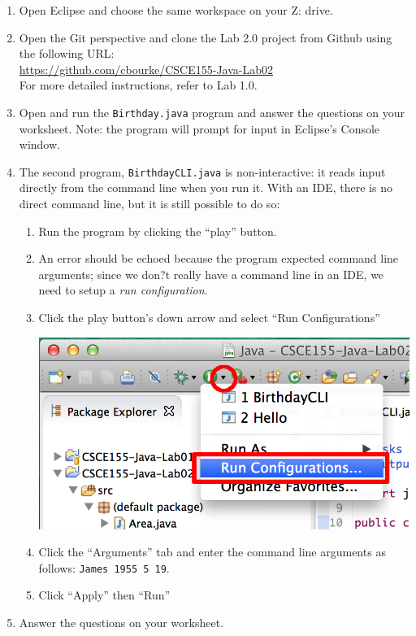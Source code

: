 \documentclass[12pt]{scrartcl}
\begin{document}
\begin{enumerate}
  \item Open Eclipse and choose the same workspace on your Z: drive.
  \item Open the Git perspective and clone the Lab 2.0 project
  	from Github using the following URL:\\
	\url{https://github.com/cbourke/CSCE155-Java-Lab02}\\
	For more detailed instructions, refer to Lab 1.0.
  \item Open and run the \texttt{Birthday.java} program and 
  	answer the questions on your worksheet.  Note: the program
	will prompt for input in Eclipse's Console window.
  \item The second program, \texttt{BirthdayCLI.java} is 
  	non-interactive: it reads input directly from the 
	command line when you run it.  With an IDE, there is no
	direct command line, but it is still possible to do so:
	\begin{enumerate}
	  \item Run the program by clicking the ``play'' button.
	  \item An error should be echoed because the program expected 
		command line arguments; since we don?t really have a command 
		line in an IDE, we need to setup a \emph{run configuration}.
	  \item Click the play button's down arrow and select ``Run Configurations''
		\begin{center}
		\includegraphics[scale=.45]{eclipseRunConfigurationMarkUp}
		\end{center}
	  \item Click the ``Arguments'' tab and enter the command 
		line arguments as follows: \texttt{James 1955 5 19}.
	  \item Click ``Apply'' then ``Run''
	\end{enumerate}
  \item Answer the questions on your worksheet.
\end{enumerate}
\end{document}

